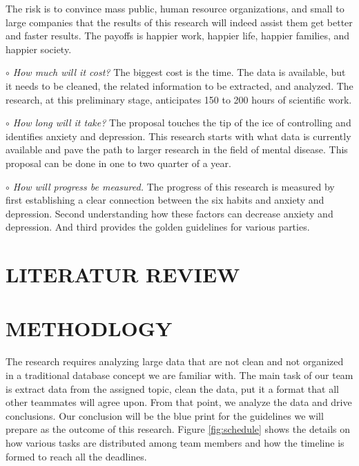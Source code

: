 \documentclass[letterpaper, 10 pt, conference]{ieeeconf}  %
\begin{document}
\textnormal{
The risk is to convince mass public, human resource organizations, and small 
to large companies that the results of this research will indeed assist them 
get better and faster results. The payoffs is happier work, happier life, 
happier families, and happier society.  
}
\par\noindent\textit{$\circ$ How much will it cost?}\newline
\textnormal{
The biggest cost is the time. The data is available, but it 
needs to be cleaned, the related information to be extracted, and analyzed. 
The research, at this preliminary stage, anticipates 150 to 200 hours of scientific work. 
}
\par\noindent\textit{$\circ$ How long will it take?}\newline
\textnormal{
The proposal touches the tip of the ice of controlling and identifies anxiety 
and depression. This research starts with what data is currently available 
and pave the path to larger research in the field of mental disease. This 
proposal can be done in one to two quarter of a year.
}
\par\noindent\textit{$\circ$ How will progress be measured.}\newline
\textnormal{
The progress of this research is measured by first establishing a clear connection 
between the six habits and anxiety and depression. Second understanding how these 
factors can decrease anxiety and depression. And third provides the golden 
guidelines for various parties.
}
\section{LITERATUR REVIEW}

\section{METHODLOGY}
The research requires analyzing large data that are not clean and not organized in 
a traditional database concept we are familiar with. The main task of our team is 
extract data from the assigned topic, clean the data, put it a format that all 
other teammates will agree upon. From that point, we analyze the data and drive 
conclusions. Our conclusion will be the blue print for the guidelines we will prepare 
as the outcome of this research. 
Figure \ref{fig:schedule} shows the details on how various tasks are distributed among team members 
and how the timeline is formed to reach all the deadlines. 
\end{document}
